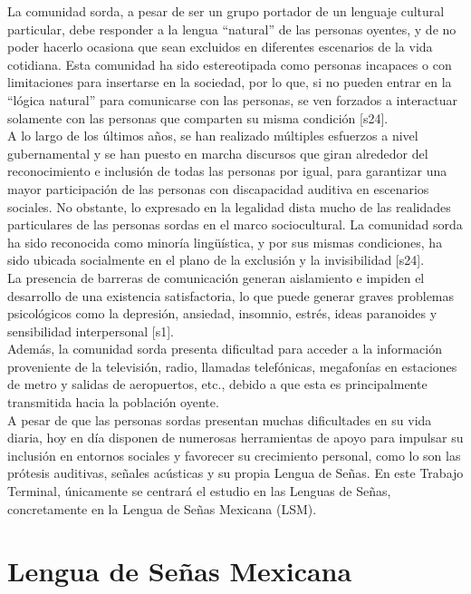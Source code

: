 La comunidad sorda, a pesar de ser un grupo portador de un lenguaje cultural particular, debe responder a la lengua “natural” de las personas oyentes, y de no poder hacerlo ocasiona que sean excluidos en diferentes escenarios de la vida cotidiana. Esta comunidad ha sido estereotipada como personas incapaces o con limitaciones para insertarse en la sociedad, por lo que, si no pueden entrar en la “lógica natural” para comunicarse con las personas, se ven forzados a interactuar solamente con las personas que comparten su misma condición [s24].\\

A lo largo de los últimos años, se han realizado múltiples esfuerzos a nivel gubernamental y se han puesto en marcha discursos que giran alrededor del reconocimiento e inclusión de todas las personas por igual, para garantizar una mayor participación de las personas con discapacidad auditiva en escenarios sociales. No obstante, lo expresado en la legalidad dista mucho de las realidades particulares de las personas sordas en el marco sociocultural. La comunidad sorda ha sido reconocida como minoría lingüística, y por sus mismas condiciones, ha sido ubicada socialmente en el plano de la exclusión y la invisibilidad [s24]. \\ 

La presencia de barreras de comunicación generan aislamiento e impiden el desarrollo de una existencia satisfactoria, lo que puede generar graves problemas psicológicos como la depresión, ansiedad, insomnio, estrés, ideas paranoides y sensibilidad interpersonal [s1].\\

Además, la comunidad sorda presenta dificultad para acceder a la información proveniente de la televisión, radio, llamadas telefónicas, megafonías en estaciones de metro y salidas de aeropuertos, etc., debido a que esta es principalmente transmitida hacia la población oyente.\\

A pesar de que las personas sordas presentan muchas dificultades en su vida diaria, hoy en día disponen de numerosas herramientas de apoyo para impulsar su inclusión en entornos sociales y favorecer su crecimiento personal, como lo son las prótesis auditivas, señales acústicas y su propia Lengua de Señas. En este Trabajo Terminal, únicamente se centrará el estudio en las Lenguas de Señas, concretamente en la Lengua de Señas Mexicana (LSM).\\

\section{Lengua de Señas Mexicana}
